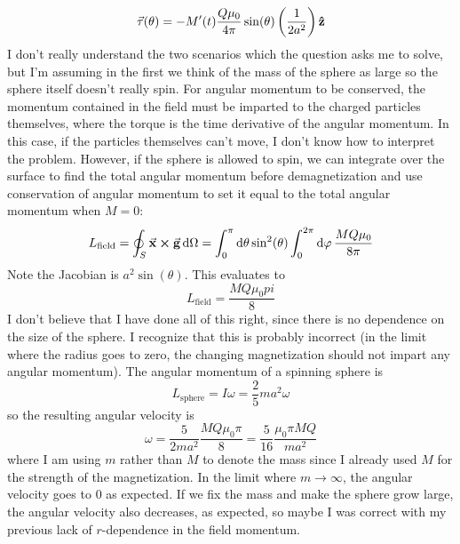 \documentclass[a4paper,twoside]{article}
\begin{document}
\begin{itemize}
\begin{problem}
            \begin{equation}
                \va{\tau}(\theta) = - M'(t) \frac{Q \mu_0}{4 \pi} \sin(\theta) \left( \frac{1}{2 a^2} \right) \vu{z}
            \end{equation}
            I don't really understand the two scenarios which the question asks me to solve, but I'm assuming in the first we think of the mass of the sphere as large so the sphere itself doesn't really spin. For angular momentum to be conserved, the momentum contained in the field must be imparted to the charged particles themselves, where the torque is the time derivative of the angular momentum. In this case, if the particles themselves can't move, I don't know how to interpret the problem. However, if the sphere is allowed to spin, we can integrate over the surface to find the total angular momentum before demagnetization and use conservation of angular momentum to set it equal to the total angular momentum when $ M = 0 $:
            \begin{equation}
                L_{\text{field}} = \oint_S \va{x} \cross \va{g} \dd{\Omega} = \int_0^{\pi} \dd{\theta} \sin[2](\theta) \int_0^{2 \pi} \dd{\varphi} \frac{M Q \mu_0}{8 \pi}
            \end{equation}
            Note the Jacobian is $ a^2 \sin(\theta) $. This evaluates to
            \begin{equation}
                L_{\text{field}} = \frac{MQ \mu_0 pi}{8}
            \end{equation}
            I don't believe that I have done all of this right, since there is no dependence on the size of the sphere. I recognize that this is probably incorrect (in the limit where the radius goes to zero, the changing magnetization should not impart any angular momentum).
            The angular momentum of a spinning sphere is
            \begin{equation}
                L_{\text{sphere}} = I \omega = \frac{2}{5} ma^2 \omega
            \end{equation}
            so the resulting angular velocity is
            \begin{equation}
                \omega = \frac{5}{2ma^2} \frac{MQ \mu_0 \pi}{8} = \frac{5}{16} \frac{\mu_0 \pi MQ}{m a^2}
            \end{equation}
            where I am using $ m $ rather than $ M $ to denote the mass since I already used $ M $ for the strength of the magnetization. In the limit where $ m \to \infty $, the angular velocity goes to $ 0 $ as expected. If we fix the mass and make the sphere grow large, the angular velocity also decreases, as expected, so maybe I was correct with my previous lack of $ r $-dependence in the field momentum.

\end{problem}
\end{itemize}
\end{document}
